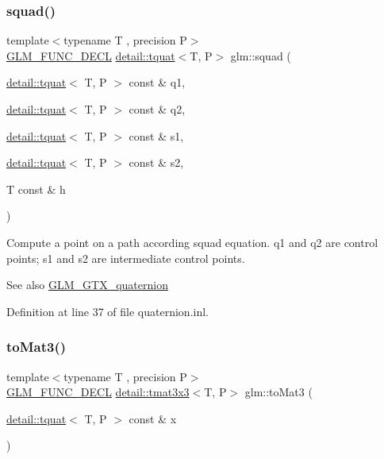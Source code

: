 \subsubsection{\texorpdfstring{squad()}{squad()}}
{\footnotesize\ttfamily template$<$typename T , precision P$>$ \\
\hyperlink{setup_8hpp_ab2d052de21a70539923e9bcbf6e83a51}{G\+L\+M\+\_\+\+F\+U\+N\+C\+\_\+\+D\+E\+CL} \hyperlink{structglm_1_1detail_1_1tquat}{detail\+::tquat}$<$T, P$>$ glm\+::squad (\begin{DoxyParamCaption}\item[{\hyperlink{structglm_1_1detail_1_1tquat}{detail\+::tquat}$<$ T, P $>$ const \&}]{q1,  }\item[{\hyperlink{structglm_1_1detail_1_1tquat}{detail\+::tquat}$<$ T, P $>$ const \&}]{q2,  }\item[{\hyperlink{structglm_1_1detail_1_1tquat}{detail\+::tquat}$<$ T, P $>$ const \&}]{s1,  }\item[{\hyperlink{structglm_1_1detail_1_1tquat}{detail\+::tquat}$<$ T, P $>$ const \&}]{s2,  }\item[{T const \&}]{h }\end{DoxyParamCaption})}

Compute a point on a path according squad equation. q1 and q2 are control points; s1 and s2 are intermediate control points.

\begin{DoxySeeAlso}{See also}
\hyperlink{group__gtx__quaternion}{G\+L\+M\+\_\+\+G\+T\+X\+\_\+quaternion} 
\end{DoxySeeAlso}


Definition at line 37 of file quaternion.\+inl.

\mbox{\label{group__gtx__quaternion_ga9955d74e4bdcfec4039c5285c6e99d8f}} 
\subsubsection{\texorpdfstring{to\+Mat3()}{toMat3()}}
{\footnotesize\ttfamily template$<$typename T , precision P$>$ \\
\hyperlink{setup_8hpp_ab2d052de21a70539923e9bcbf6e83a51}{G\+L\+M\+\_\+\+F\+U\+N\+C\+\_\+\+D\+E\+CL} \hyperlink{structglm_1_1detail_1_1tmat3x3}{detail\+::tmat3x3}$<$T, P$>$ glm\+::to\+Mat3 (\begin{DoxyParamCaption}\item[{\hyperlink{structglm_1_1detail_1_1tquat}{detail\+::tquat}$<$ T, P $>$ const \&}]{x }\end{DoxyParamCaption})}

